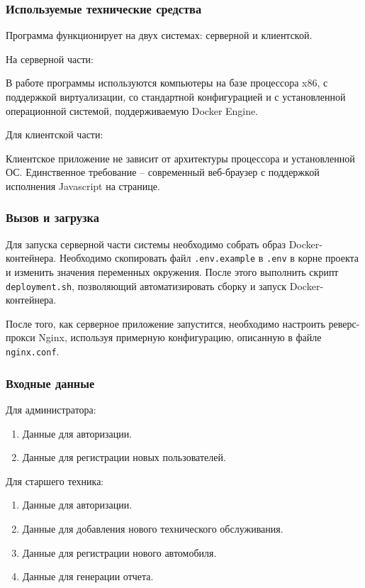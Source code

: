 \documentclass[../nirs.tex]{subfiles}
\begin{document}
    \subsubsection*{Используемые технические средства}

    Программа функционирует на двух системах: серверной и клиентской.

    На серверной части:

    В работе программы используются компьютеры на базе процессора x86, с
    поддержкой виртуализации, со стандартной конфигурацией и с установленной
    операционной системой, поддерживаемую Docker Engine.

    Для клиентской части:

    Клиентское приложение не зависит от архитектуры процессора и установленной ОС.
    Единственное требование -- современный веб-браузер с поддержкой исполнения
    Javascript на странице.

    \subsubsection*{Вызов и загрузка}

    Для запуска серверной части системы необходимо собрать образ
    Docker-контейнера. Необходимо скопировать файл
    \texttt{.env.example} в \texttt{.env} в корне проекта и изменить значения
    переменных окружения. После этого выполнить скрипт \texttt{deployment.sh},
    позволяющий автоматизировать сборку и запуск Docker-контейнера.

    После того, как серверное приложение запустится, необходимо настроить
    реверс-прокси Nginx, используя примерную конфигурацию, описанную в файле
    \texttt{nginx.conf}.

    \subsubsection*{Входные данные}
    Для администратора:
    \begin{enumerate}
        \item Данные для авторизации.
        \item Данные для регистрации новых пользователей.
    \end{enumerate}

    Для старшего техника:
    \begin{enumerate}
        \item Данные для авторизации.
        \item Данные для добавления нового технического обслуживания.
        \item Данные для регистрации нового автомобиля.
        \item Данные для генерации отчета.
    \end{enumerate}
\end{document}
